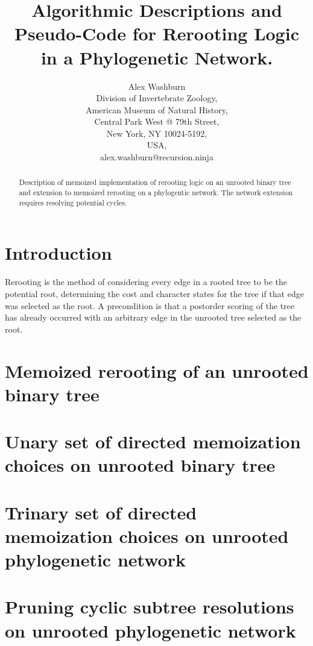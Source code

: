\documentclass[11pt]{article}
\title{Algorithmic Descriptions and Pseudo-Code for Rerooting Logic in a Phylogenetic Network.}
\author{  Alex Washburn
       \\ Division of Invertebrate Zoology,
       \\ American Museum of Natural History,
       \\ Central Park West @ 79th Street,
       \\ New York, NY 10024-5192,
       \\ USA,
       \\ alex.washburn@recursion.ninja
       }
\begin{document}
\maketitle
\begin{abstract}
    Description of memoized implementation of rerooting logic on an unrooted binary tree and extension to memoized rerooting on a phylogentic network. The network extension requires resolving potential cycles.
\end{abstract}

\section{Introduction}
Rerooting is the method of considering every edge in a rooted tree to be the potential root, determining the cost and character states for the tree if that edge was selected as the root. A precondition is that a postorder scoring of the tree has already occurred with an arbitrary edge in the unrooted tree selected as the root.

\section{Memoized rerooting of an unrooted binary tree}
 
\section{Unary set of directed memoization choices on unrooted binary tree}
 
\section{Trinary set of directed memoization choices on unrooted phylogenetic network}

\section{Pruning cyclic subtree resolutions on unrooted phylogenetic network}
\end{document}
